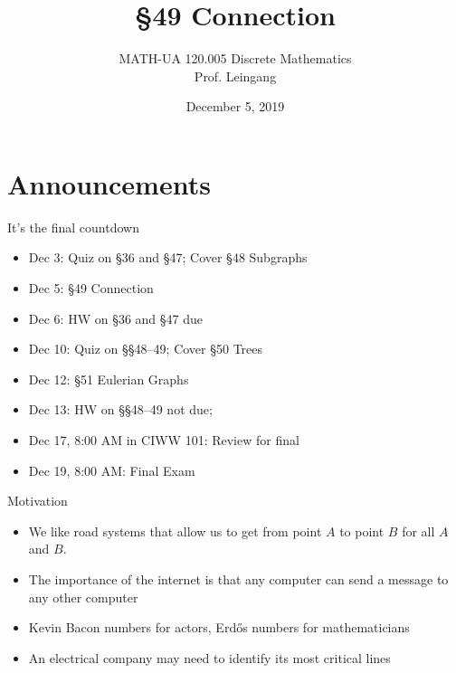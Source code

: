 \documentclass[ignorenonframetext,aspectratio=169]{beamer}
\title{\S49 Connection}
\author{MATH-UA 120.005 Discrete Mathematics \\ Prof. Leingang}
\date{December 5, 2019}
\begin{document}
\begin{frame}%
    \maketitle
\end{frame}

\section*{Announcements}

\begin{frame}{It's the final countdown}%
\begin{itemize}
\item Dec 3: Quiz on \S36 and \S47; Cover \S48 Subgraphs
\item Dec 5: \S49 Connection
\item Dec 6: HW on \S36 and \S47 due
\item Dec 10: Quiz on \S\S48–49; Cover \S50 Trees
\item Dec 12: \S51 Eulerian Graphs
\item Dec 13: HW on \S\S48–49 not due;
\item Dec 17, 8:00 AM in CIWW 101: Review for final
\item Dec 19, 8:00 AM: Final Exam
\end{itemize}
\end{frame}

\begin{frame}{Motivation}
\begin{itemize}
\item We like road systems that allow us to get from point $A$ to point $B$ for all $A$ and $B$.
\item The importance of the internet is that any computer can send a message to any other computer
\item Kevin Bacon numbers for actors, Erd\H os numbers for mathematicians
\item An electrical company may need to identify its most critical lines
\end{itemize}
\end{frame}

\end{document}
